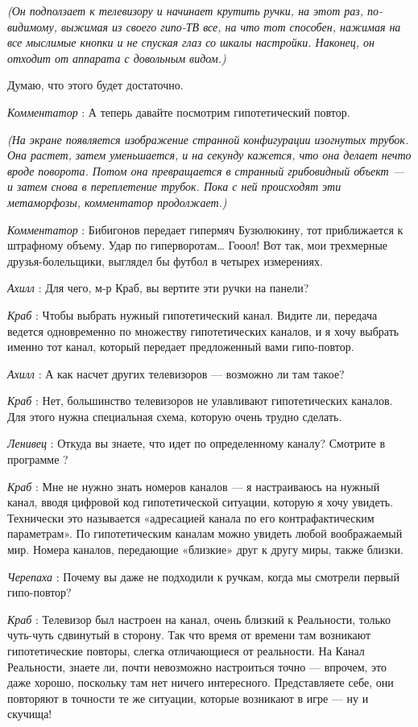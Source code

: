 \emph{(Он подползает к телевизору и начинает крутить ручки, на этот раз, по-видимому, выжимая из своего гипо-ТВ все, на что тот способен, нажимая на все мыслимые кнопки и не спуская глаз со шкалы настройки. Наконец, он отходит от аппарата с довольным видом.)}

Думаю, что этого будет достаточно.

\emph{Комментатор} : А теперь давайте посмотрим гипотетический повтор.

\emph{(На экране появляется изображение странной конфигурации изогнутых трубок. Она растет, затем уменьшается, и на секунду кажется, что она делает нечто вроде поворота. Потом она превращается в странный грибовидный объект --- и затем снова в переплетение трубок. Пока с ней происходят эти метаморфозы, комментатор продолжает.)}

\emph{Комментатор} : Бибигонов передает гипермяч Бузюлюкину, тот приближается к штрафному объему. Удар по гиперворотам\ldots{} Гооол! Вот так, мои трехмерные друзья-болельщики, выглядел бы футбол в четырех измерениях.

\emph{Ахилл} : Для чего, м-р Краб, вы вертите эти ручки на панели?

\emph{Краб} : Чтобы выбрать нужный гипотетический канал. Видите ли, передача ведется одновременно по множеству гипотетических каналов, и я хочу выбрать именно тот канал, который передает предложенный вами гипо-повтор.

\emph{Ахилл} : А как насчет других телевизоров --- возможно ли там такое?

\emph{Краб} : Нет, большинство телевизоров не улавливают гипотетических каналов. Для этого нужна специальная схема, которую очень трудно сделать.

\emph{Ленивец} : Откуда вы знаете, что идет по определенному каналу? Смотрите в программе ?

\emph{Краб} : Мне не нужно знать номеров каналов --- я настраиваюсь на нужный канал, вводя цифровой код гипотетической ситуации, которую я хочу увидеть. Технически это называется «адресацией канала по его контрафактическим параметрам». По гипотетическим каналам можно увидеть любой воображаемый мир. Номера каналов, передающие «близкие» друг к другу миры, также близки.

\emph{Черепаха} : Почему вы даже не подходили к ручкам, когда мы смотрели первый гипо-повтор?

\emph{Краб} : Телевизор был настроен на канал, очень близкий к Реальности, только чуть-чуть сдвинутый в сторону. Так что время от времени там возникают гипотетические повторы, слегка отличающиеся от реальности. На Канал Реальности, знаете ли, почти невозможно настроиться точно --- впрочем, это даже хорошо, поскольку там нет ничего интересного. Представляете себе, они повторяют в точности те же ситуации, которые возникают в игре --- ну и скучища!

